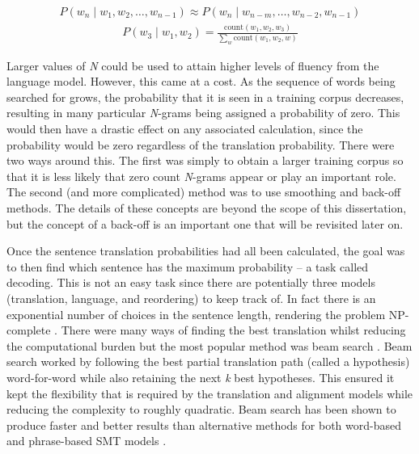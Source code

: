 \documentclass[11pt]{article}
\begin{document}
\begin{align}
    P(w_n \mid w_1, w_2, \dots, w_{n-1}) \approx P(w_n \mid w_{n-m}, \dots, w_{n-2}, w_{n-1})
\end{align}
\begin{align}
    P(w_3 \mid w_1, w_2) = \frac{\textrm{count}(w_1, w_2, w_3)}{\sum_w \textrm{count}(w_1, w_2, w)}
\end{align}

\bigskip

Larger values of \textit{N} could be used to attain higher levels of fluency from the language model. However, this came at a cost. As the sequence of words being searched for grows, the probability that it is seen in a training corpus decreases, resulting in many particular \textit{N}-grams being assigned a probability of zero. This would then have a drastic effect on any associated calculation, since the probability would be zero regardless of the translation probability. There were two ways around this. The first was simply to obtain a larger training corpus so that it is less likely that zero count \textit{N}-grams appear or play an important role. The second (and more complicated) method was to use smoothing and back-off methods. The details of these concepts are beyond the scope of this dissertation, but the concept of a back-off is an important one that will be revisited later on.

\bigskip

Once the sentence translation probabilities had all been calculated, the goal was to then find which sentence has the maximum probability -- a task called decoding. This is not an easy task since there are potentially three models (translation, language, and reordering) to keep track of. In fact there is an exponential number of choices in the sentence length, rendering the problem NP-complete \citep{knight-1999-decoding}. There were many ways of finding the best translation whilst reducing the computational burden but the most popular method was beam search \citep[ch. 6]{koehn2010}. Beam search worked by following the best partial translation path (called a hypothesis) word-for-word while also retaining the next \textit{k} best hypotheses. This ensured it kept the flexibility that is required by the translation and alignment models while reducing the complexity to roughly quadratic. Beam search has been shown to produce faster and better results than alternative methods for both word-based and phrase-based SMT models \citep{koehn2004pharaoh, och2002statistical}.
\end{document}
